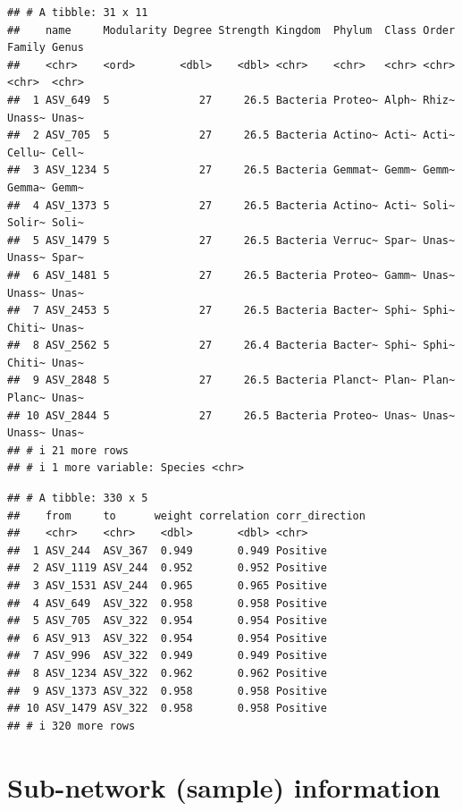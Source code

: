\documentclass[
]{book}
\newenvironment{Shaded}{\begin{snugshade}}{\end{snugshade}}
\newcommand{\CommentTok}[1]{\textcolor[rgb]{0.56,0.35,0.01}{\textit{#1}}}
\newcommand{\NormalTok}[1]{#1}
\newcommand{\SpecialCharTok}[1]{\textcolor[rgb]{0.81,0.36,0.00}{\textbf{#1}}}
\begin{document}
\begin{verbatim}
## # A tibble: 31 x 11
##    name     Modularity Degree Strength Kingdom  Phylum  Class Order Family Genus
##    <chr>    <ord>       <dbl>    <dbl> <chr>    <chr>   <chr> <chr> <chr>  <chr>
##  1 ASV_649  5              27     26.5 Bacteria Proteo~ Alph~ Rhiz~ Unass~ Unas~
##  2 ASV_705  5              27     26.5 Bacteria Actino~ Acti~ Acti~ Cellu~ Cell~
##  3 ASV_1234 5              27     26.5 Bacteria Gemmat~ Gemm~ Gemm~ Gemma~ Gemm~
##  4 ASV_1373 5              27     26.5 Bacteria Actino~ Acti~ Soli~ Solir~ Soli~
##  5 ASV_1479 5              27     26.5 Bacteria Verruc~ Spar~ Unas~ Unass~ Spar~
##  6 ASV_1481 5              27     26.5 Bacteria Proteo~ Gamm~ Unas~ Unass~ Unas~
##  7 ASV_2453 5              27     26.5 Bacteria Bacter~ Sphi~ Sphi~ Chiti~ Unas~
##  8 ASV_2562 5              27     26.4 Bacteria Bacter~ Sphi~ Sphi~ Chiti~ Unas~
##  9 ASV_2848 5              27     26.5 Bacteria Planct~ Plan~ Plan~ Planc~ Unas~
## 10 ASV_2844 5              27     26.5 Bacteria Proteo~ Unas~ Unas~ Unass~ Unas~
## # i 21 more rows
## # i 1 more variable: Species <chr>
\end{verbatim}

\begin{Shaded}
\end{Shaded}

\begin{verbatim}
## # A tibble: 330 x 5
##    from     to      weight correlation corr_direction
##    <chr>    <chr>    <dbl>       <dbl> <chr>         
##  1 ASV_244  ASV_367  0.949       0.949 Positive      
##  2 ASV_1119 ASV_244  0.952       0.952 Positive      
##  3 ASV_1531 ASV_244  0.965       0.965 Positive      
##  4 ASV_649  ASV_322  0.958       0.958 Positive      
##  5 ASV_705  ASV_322  0.954       0.954 Positive      
##  6 ASV_913  ASV_322  0.954       0.954 Positive      
##  7 ASV_996  ASV_322  0.949       0.949 Positive      
##  8 ASV_1234 ASV_322  0.962       0.962 Positive      
##  9 ASV_1373 ASV_322  0.958       0.958 Positive      
## 10 ASV_1479 ASV_322  0.958       0.958 Positive      
## # i 320 more rows
\end{verbatim}

\section{Sub-network (sample) information}\label{sub-network-sample-information}
\end{document}
